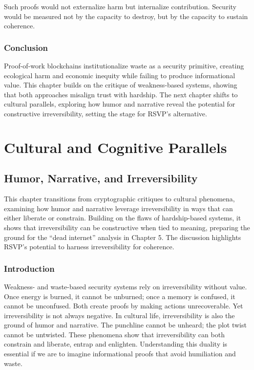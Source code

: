 \documentclass[openany]{book}
\begin{document}
Such proofs would not externalize harm but internalize contribution. Security would be measured not by the capacity to destroy, but by the capacity to sustain coherence.

\section{Conclusion}

Proof-of-work blockchains institutionalize waste as a security primitive, creating ecological harm and economic inequity while failing to produce informational value. This chapter builds on the critique of weakness-based systems, showing that both approaches misalign trust with hardship. The next chapter shifts to cultural parallels, exploring how humor and narrative reveal the potential for constructive irreversibility, setting the stage for RSVP’s alternative.

\part{Cultural and Cognitive Parallels}

\chapter{Humor, Narrative, and Irreversibility}

This chapter transitions from cryptographic critiques to cultural phenomena, examining how humor and narrative leverage irreversibility in ways that can either liberate or constrain. Building on the flaws of hardship-based systems, it shows that irreversibility can be constructive when tied to meaning, preparing the ground for the ``dead internet'' analysis in Chapter 5. The discussion highlights RSVP’s potential to harness irreversibility for coherence.

\section{Introduction}

Weakness- and waste-based security systems rely on irreversibility without value. Once energy is burned, it cannot be unburned; once a memory is confused, it cannot be unconfused. Both create proofs by making actions unrecoverable. Yet irreversibility is not always negative. In cultural life, irreversibility is also the ground of humor and narrative. The punchline cannot be unheard; the plot twist cannot be untwisted. These phenomena show that irreversibility can both constrain and liberate, entrap and enlighten. Understanding this duality is essential if we are to imagine informational proofs that avoid humiliation and waste.
\end{document}
